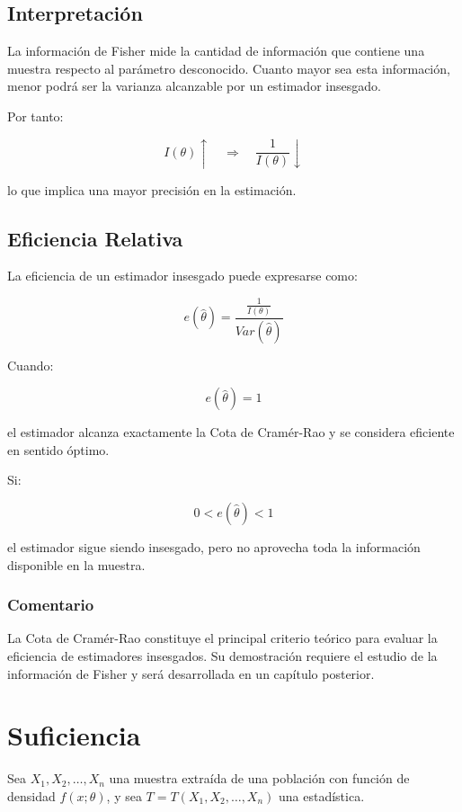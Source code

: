 \documentclass[
  11pt,
]{report}
\begin{document}
\subsection{Interpretación}\label{interpretaciuxf3n-3}

La información de Fisher mide la cantidad de información que contiene
una muestra respecto al parámetro desconocido. Cuanto mayor sea esta
información, menor podrá ser la varianza alcanzable por un estimador
insesgado.

Por tanto:

\[I(\theta)\uparrow
\quad\Longrightarrow\quad
\frac{1}{I(\theta)}\downarrow\]

lo que implica una mayor precisión en la estimación.

\subsection{Eficiencia Relativa}\label{eficiencia-relativa}

La eficiencia de un estimador insesgado puede expresarse como:

\[e(\hat{\theta})
=
\frac{\frac{1}{I(\theta)}}
     {Var(\hat{\theta})}\]

Cuando:

\[e(\hat{\theta})=1\]

el estimador alcanza exactamente la Cota de Cramér-Rao y se considera
eficiente en sentido óptimo.

Si:

\[0<e(\hat{\theta})<1\]

el estimador sigue siendo insesgado, pero no aprovecha toda la
información disponible en la muestra.

\subsubsection{Comentario}\label{comentario-1}

La Cota de Cramér-Rao constituye el principal criterio teórico para
evaluar la eficiencia de estimadores insesgados. Su demostración
requiere el estudio de la información de Fisher y será desarrollada en
un capítulo posterior.

\section{Suficiencia}\label{suficiencia}

Sea \(X_1, X_2, \ldots, X_n\) una muestra extraída de una población con
función de densidad \(f(x;\theta)\), y sea
\(T = T(X_1, X_2, \ldots, X_n)\) una estadística.
\end{document}
